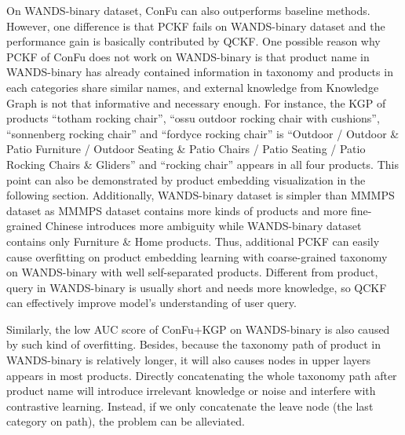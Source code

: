 On WANDS-binary dataset, ConFu can also outperforms baseline methods. However, one difference is that PCKF fails on WANDS-binary dataset and the performance gain is basically contributed by QCKF. One possible reason why PCKF of ConFu does not work on WANDS-binary is that product name in WANDS-binary has already contained information in taxonomy and products in each categories share similar names, and external knowledge from Knowledge Graph is not that informative and necessary enough. For instance, the KGP of products ``totham rocking chair'', ``ossu outdoor rocking chair with cushions'', ``sonnenberg rocking chair'' and ``fordyce rocking chair'' is ``Outdoor / Outdoor \& Patio Furniture / Outdoor Seating \& Patio Chairs / Patio Seating / Patio Rocking Chairs \& Gliders'' and ``rocking chair'' appears in all four products. This point can also be demonstrated by product embedding visualization in the following section. Additionally, WANDS-binary dataset is simpler than MMMPS dataset as MMMPS dataset contains more kinds of products and more fine-grained Chinese introduces more ambiguity while WANDS-binary dataset contains only Furniture \& Home products. Thus, additional PCKF can easily cause overfitting on product embedding learning with coarse-grained taxonomy on WANDS-binary with well self-separated products. Different from product, query in WANDS-binary is usually short and needs more knowledge, so QCKF can effectively improve model's understanding of user query. 

Similarly, the low AUC score of ConFu+KGP on WANDS-binary is also caused by such kind of overfitting. Besides, because the taxonomy path of product in WANDS-binary is relatively longer, it will also causes nodes in upper layers appears in most products. Directly concatenating the whole taxonomy path after product name will introduce irrelevant knowledge or noise and interfere with contrastive learning. Instead, if we only concatenate the leave node (the last category on path), the problem can be alleviated.


